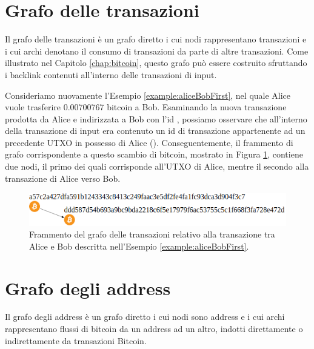 \section{Grafo delle transazioni} \label{sec:grafoDelleTransazioniProblema}

Il grafo delle transazioni è un grafo diretto i cui nodi rappresentano transazioni e i cui archi denotano il consumo di transazioni da parte di altre transazioni. Come illustrato nel Capitolo \ref{chap:bitcoin}, questo grafo può essere costruito sfruttando i backlink contenuti all’interno delle transazioni di input.

\begin{example}

Consideriamo nuovamente l’Esempio \ref{example:aliceBobFirst}, nel quale Alice vuole trasferire 0.00700767 bitcoin a Bob. Esaminando la nuova  transazione prodotta da Alice e indirizzata a Bob con l’id , possiamo osservare che all’interno della transazione di input era contenuto un id di transazione appartenente ad un precedente UTXO in possesso di Alice (). Conseguentemente, il frammento di grafo corrispondente a questo scambio di bitcoin, mostrato in Figura \ref{fig:graphtxproblem}, contiene due nodi, il primo dei quali corrisponde all'UTXO di Alice, mentre il secondo alla transazione di Alice verso Bob.

\begin{figure}[H]
\centering
\includegraphics[scale=0.35]{images/exampleWithGraph/aliceBoxTx.png}
\caption{Frammento del grafo delle transazioni relativo alla  transazione tra Alice e Bob descritta nell’Esempio \ref{example:aliceBobFirst}.\label{fig:graphtxproblem}}
\end{figure}

\end{example}

\section{Grafo degli address} \label{sec:grafoDegliAddressProblema}

Il grafo degli address è un grafo diretto i cui nodi sono address e i cui archi rappresentano flussi di bitcoin da un address ad un altro, indotti direttamente o indirettamente da transazioni Bitcoin.

